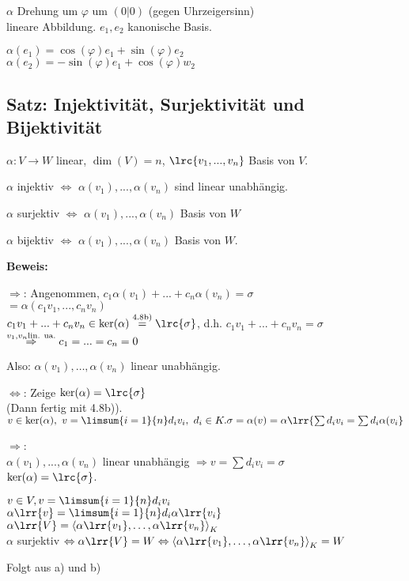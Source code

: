   $\alpha$ Drehung um $\varphi$ um $(0|0)$ (gegen Uhrzeigersinn)\\
  lineare Abbildung. $e_1,e_2$ kanonische Basis.

  $\alpha(e_1)=\cos(\varphi)e_1+\sin(\varphi)e_2$\\
  $\alpha(e_2)=-\sin(\varphi)e_1+\cos(\varphi)w_2$

  \subsection{Satz: Injektivität, Surjektivität und Bijektivität}

  $\alpha:V\rightarrow W$ linear, $\dim(V)=n$, $\lrc{v_1,...,v_n}$ Basis von $V$.

    \item $\alpha$ injektiv $\Leftrightarrow$ $\alpha(v_1),...,\alpha(v_n)$
      sind linear unabhängig.
    \item $\alpha$ surjektiv $\Leftrightarrow$ $\alpha(v_1),...,\alpha(v_n)$
      Basis von $W$
    \item $\alpha$ bijektiv $\Leftrightarrow$ $\alpha(v_1),...,\alpha(v_n)$
      Basis von $W$.
  \subExEnd

  \textbf{Beweis:}
    \item
      $\Rightarrow$: Angenommen, $c_1\alpha(v_1)+...+c_n\alpha(v_n)=\sigma$\\
      $=\alpha(c_1v_1,...,c_nv_n)$\\
      $c_1v_1+...+c_nv_n\in\mbox{ker}(\alpha)\overset{\mbox{\scriptsize 4.8b)}}{=}\lrc{\sigma}$, d.h. $c_1v_1+...+c_nv_n=\sigma$\\
      $\overset{v_1,v_n\mbox{\scriptsize lin. ua.}}{\Rightarrow} c_1=...=c_n=0$

      Also: $\alpha(v_1),\dots,\alpha(v_n)$ linear unabhängig.

      $\Leftrightarrow$: Zeige $\mbox{ker}(\alpha)=\lrc{\sigma}$\\
      (Dann fertig mit 4.8b)).\\
      $v\in\mbox{ker}(\alpha),\ v=\limsum{i=1}{n}d_iv_i,\ d_i\in K.\\
      \sigma=\alpha(v)=\alpha\lrr{\sum d_iv_i=\sum d_i\alpha(v_i}$

      $\Rightarrow$:\\
      $\alpha(v_1),...,\alpha(v_n)$ linear unabhängig $\Rightarrow v=\sum
      d_iv_i=\sigma$\\
      $\mbox{ker}(\alpha)=\lrc{\sigma}$.
     \item $v\in V, v=\limsum{i=1}{n}d_iv_i$\\
		$\alpha\lrr{v}=\limsum{i=1}{n}d_i\alpha\lrr{v_i}$\\
		$\alpha\lrr{V}=\left\langle\alpha\lrr{v_1},\dots,\alpha\lrr{v_n}\right\rangle_K$\\
		$\alpha$ surjektiv $\Leftrightarrow \alpha\lrr{V}=W \Leftrightarrow\left\langle\alpha\lrr{v_1},\dots,\alpha\lrr{v_n}\right\rangle_K=W$
	 \item Folgt aus a) und b)
	\subExEnd

